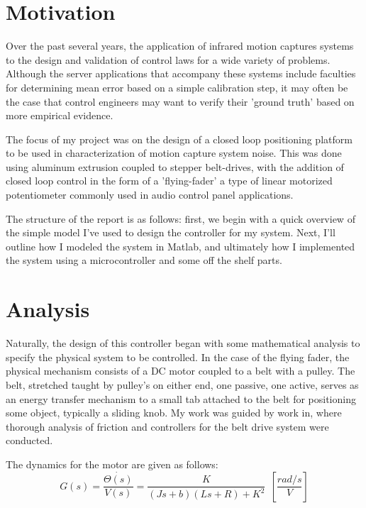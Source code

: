 \documentclass[Nomencl]{SelimArticle}
\begin{document}
\mytitlepage
\tableofcontents
\newpage
\printnomenclature %
\newpage

\section{Motivation}
Over the past several years, the application of infrared motion captures systems to the design and validation of control laws for a wide variety of problems. Although the server applications that accompany these systems include faculties for determining mean error based on a simple calibration step, it may often be the case that control engineers may want to verify their 'ground truth' based on more empirical evidence.

The focus of my project was on the design of  a closed loop positioning platform to be used in characterization of motion capture system noise. This was done using aluminum extrusion coupled to stepper belt-drives, with the addition of closed loop control in the form of a 'flying-fader' a type of linear motorized potentiometer commonly used in audio control panel applications. 

The structure of the report is as follows: first, we begin with a quick overview of the simple model I've used to design the controller for my system. Next, I'll outline how I modeled the system in Matlab, and ultimately how I implemented the system using a microcontroller and some off the shelf parts. 


\section{Analysis}
Naturally, the design of this controller began with some mathematical analysis to specify the physical system to be controlled. In the case of the flying fader, the physical mechanism consists of a DC motor coupled to a belt with a pulley. The belt, stretched taught by pulley's on either end, one passive, one active, serves as an energy transfer mechanism to a small tab attached to the belt for positioning some object, typically a sliding knob. My work was guided by work in\cite{beltModeling}, where thorough analysis of friction and controllers for the belt drive system were conducted.

The dynamics for the motor are given as follows:
\begin{equation}
G(s) = \frac{\dot{\Theta(s)}}{V(s)} = \frac{K}{(Js + b)(Ls+R)+K^2}~~ [\frac{rad/s}{V}]
\end{equation}
\end{document}
